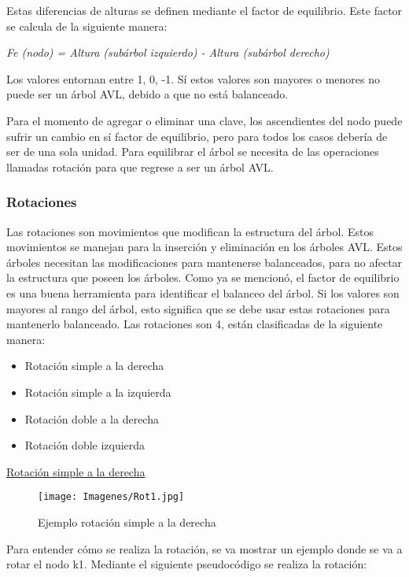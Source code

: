\documentclass[12pt]{article}
\begin{document}
Estas diferencias de alturas se definen mediante el factor de equilibrio. Este factor se calcula de la siguiente manera:

\begin{center}
    \textit{Fe (nodo) = Altura (subárbol izquierdo)  -  Altura (subárbol derecho) }
\end{center}

Los valores entornan entre 1, 0, -1. Sí estos valores son mayores o menores no puede ser un árbol AVL, debido a que no está balanceado.

Para el momento de agregar o eliminar una clave, los ascendientes del nodo puede sufrir un cambio en sí factor de equilibrio, pero para todos los casos debería de ser de una sola unidad. Para equilibrar el árbol se necesita de las operaciones llamadas rotación para que regrese a ser un árbol AVL.

\subsubsection{Rotaciones}
Las rotaciones son movimientos que modifican la estructura del árbol. Estos movimientos se manejan para la inserción y eliminación en los árboles AVL. Estos árboles necesitan las modificaciones para mantenerse balanceados, para no afectar la estructura que poseen los árboles. Como ya se mencionó, el factor de equilibrio es una buena herramienta para identificar el balanceo del árbol. Si los valores son mayores al rango del árbol, esto significa que se debe usar estas rotaciones para mantenerlo balanceado. Las rotaciones son 4, están clasificadas de la siguiente manera:

\begin{itemize}
    \item Rotación simple a la derecha
    \item Rotación simple a la izquierda
    \item Rotación doble a la derecha
    \item Rotación doble izquierda
\end{itemize}

\underline{Rotación simple a la derecha}

\begin{figure}[H]
   \centering
   \texttt{[image: Imagenes/Rot1.jpg]}
   \caption{Ejemplo rotación simple a la derecha}
   \label{imagen1}
\end{figure}

Para entender cómo se realiza la rotación, se va  mostrar un ejemplo donde se va a rotar el nodo k1. Mediante el siguiente pseudocódigo  se realiza la rotación:
\end{document}
